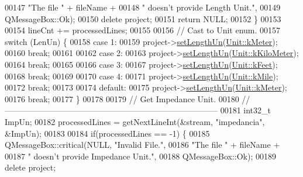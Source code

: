 \begin{DoxyCode}
00147                           \textcolor{stringliteral}{"The file "} + fileName +
00148                           \textcolor{stringliteral}{" doesn't provide Length Unit."},
00149                           QMessageBox::Ok);
00150     \textcolor{keyword}{delete} project;
00151     \textcolor{keywordflow}{return} NULL;
00152   \}
00153 
00154   lineCnt += processedLines;
00155 
00156 \textcolor{comment}{// Cast to Unit enum.}
00157   \textcolor{keywordflow}{switch} (LenUn) \{
00158   \textcolor{keywordflow}{case} 1:
00159     project->\hyperlink{class_project_a846ee2284b0856d461b35d78d9f8e1d6}{setLengthUn}(\hyperlink{class_unit_a8c8921f7b225ad6063b1cb573425b9a0abfa41ebe7ee649a1f02c9b8ae570434b}{Unit::kMeter});
00160     \textcolor{keywordflow}{break};
00161 
00162   \textcolor{keywordflow}{case} 2:
00163     project->\hyperlink{class_project_a846ee2284b0856d461b35d78d9f8e1d6}{setLengthUn}(\hyperlink{class_unit_a8c8921f7b225ad6063b1cb573425b9a0a1c04f3dd196dbe1832a2658215b0d919}{Unit::kKiloMeter});
00164     \textcolor{keywordflow}{break};
00165 
00166   \textcolor{keywordflow}{case} 3:
00167     project->\hyperlink{class_project_a846ee2284b0856d461b35d78d9f8e1d6}{setLengthUn}(\hyperlink{class_unit_a8c8921f7b225ad6063b1cb573425b9a0a9ac9b167b0ebce477fb53d6ace04ddc8}{Unit::kFeet});
00168     \textcolor{keywordflow}{break};
00169 
00170   \textcolor{keywordflow}{case} 4:
00171     project->\hyperlink{class_project_a846ee2284b0856d461b35d78d9f8e1d6}{setLengthUn}(\hyperlink{class_unit_a8c8921f7b225ad6063b1cb573425b9a0a2ebde742068bbee0510de32fbb4cd724}{Unit::kMile});
00172     \textcolor{keywordflow}{break};
00173 
00174   \textcolor{keywordflow}{default}:
00175     project->\hyperlink{class_project_a846ee2284b0856d461b35d78d9f8e1d6}{setLengthUn}(\hyperlink{class_unit_a8c8921f7b225ad6063b1cb573425b9a0abfa41ebe7ee649a1f02c9b8ae570434b}{Unit::kMeter});
00176     \textcolor{keywordflow}{break};
00177   \}
00178 
00179 \textcolor{comment}{// Get Impedance Unit.}
00180 \textcolor{comment}{//------------------------------------------------------------------------------}
00181   int32\_t ImpUn;
00182   processedLines = getNextLineInt(&stream, \textcolor{stringliteral}{"impedancia"}, &ImpUn);
00183 
00184   \textcolor{keywordflow}{if}(processedLines == -1) \{
00185     QMessageBox::critical(NULL, \textcolor{stringliteral}{"Invalid File."},
00186                           \textcolor{stringliteral}{"The file "} + fileName +
00187                           \textcolor{stringliteral}{" doesn't provide Impedance Unit."},
00188                           QMessageBox::Ok);
00189     \textcolor{keyword}{delete} project;

\end{DoxyCode}
